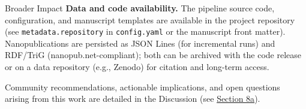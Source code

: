 \documentclass[
  ignorenonframetext,
]{beamer}
\begin{document}
\begin{frame}{Broader Impact}
\textbf{Data and code availability.} The pipeline source code,
configuration, and manuscript templates are available in the project
repository (see \texttt{metadata.repository} in \texttt{config.yaml} or
the manuscript front matter). Nanopublications are persisted as JSON
Lines (for incremental runs) and RDF/TriG (nanopub.net-compliant); both
can be archived with the code release or on a data repository (e.g.,
Zenodo) for citation and long-term access.

Community recommendations, actionable implications, and open questions
arising from this work are detailed in the Discussion (see
\hyperref[sec:discussion]{Section 8a}).
\end{frame}
\end{document}
